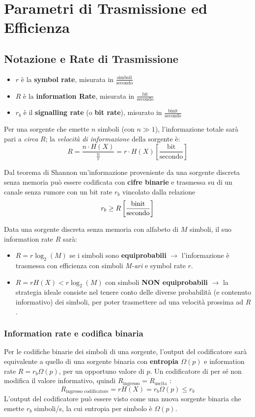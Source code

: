 \section{Parametri di Trasmissione ed Efficienza}

\subsection{Notazione e Rate di Trasmissione}
\begin{itemize}
    \item $r$ è la \textbf{symbol rate}, misurata in $\frac{\text{simboli}}{\text{secondo}}$
    \item $R$ è la \textbf{information Rate}, misurata in $\frac{\text{bit}}{\text{secondo}}$
    \item $r_b$ è il \textbf{signalling rate} (o \textbf{bit rate}), misurato in $\frac{\text{binit}}{\text{secondo}}$
\end{itemize}

Per una sorgente che emette $n$ simboli (con $n \gg 1$), l'informazione totale sarà pari a \textit{circa} $R$; la \textit{velocità di informazione} della sorgente è:
\[ R = \frac{n \cdot H(X)}{\frac{n}{r}} = r \cdot H(X) \left[\frac{\text{bit}}{\text{secondo}}\right]\]

Dal teorema di Shannon un'informazione proveniente da una sorgente discreta senza memoria può essere codificata con \textbf{cifre binarie} e trasmessa su di un canale senza rumore con un bit rate $r_b$ vincolato dalla relazione
\[r_b \geq R \space \left[\frac{\text{binit}}{\text{secondo}}\right] \]

Data una sorgente discreta senza memoria con alfabeto di $M$ simboli, il suo information rate $R$ sarà:
\begin{itemize}
    \item $R = r\log_2(M)$ se i simboli sono \textbf{equiprobabili} $\rightarrow$ l'informazione è trasmessa con efficienza con simboli \textit{M-ari} e symbol rate $r$.
    \item $R = rH(X) < r\log_2(M)$ con simboli \textbf{NON equiprobabili} $\rightarrow$ la strategia ideale consiste nel tenere conto delle diverse probabilità (e contenuto informativo) dei simboli, per poter trasmettere ad una velocità prossima ad $R$.
\end{itemize}

\subsubsection{Information rate e codifica binaria}
Per le codifiche binarie dei simboli di una sorgente, l'output del codificatore sarà equivalente a quello di una sorgente binaria con \textbf{entropia $\Omega(p)$} e information rate \textbf{$R = r_b\Omega(p)$}, per un opportuno valore di $p$.
Un codificatore di per sé non modifica il valore informativo, quindi $R_{\text{ingresso}} = R_{\text{uscita}}$ :
\[R_{\text{ingresso codificatore}} = rH(X)= r_b\Omega(p) \leq r_b\]
L'output del codificatore può essere visto come una nuova sorgente binaria che emette $r_b$ simboli/s, la cui entropia per simbolo è $\Omega(p)$.

